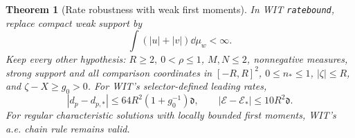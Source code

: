 \documentclass[11pt]{article}
\numberwithin{equation}{section}
\newtheorem{theorem}{Theorem}[section]
\theoremstyle{remark}\newtheorem{remark}[theorem]{Remark}
\newcommand{\dist}{\mathfrak d}
\begin{document}
\begin{theorem}[Rate robustness with weak first moments]
\label{an07cwiv1:rate}
In WIT \texttt{ratebound}, replace compact weak support by
\[
 \int (|u|+|v|)\dd\mu_w<\infty .
 \]
Keep every other hypothesis: \(R\ge2,\ 0<\rho\le1\),
\(M,N\le2\), nonnegative measures, strong support and all
comparison coordinates in \([-R,R]^2\), \(0\le n_*\le1\),
\(|\zeta|\le R\), and \(\zeta-X\ge g_0>0\).
For WIT's selector-defined leading rates,
\begin{equation}
 |d_p-d_{p,*}|\le64R^2(1+g_0^{-1})\dist,\qquad
 |\mathcal E-\mathcal E_*|\le10R^2\dist.
 \label{an07cwiv1:ratebound}
\end{equation}
For regular characteristic solutions with locally bounded
first moments, WIT's a.e. chain rule remains valid.
\end{theorem}
\end{document}
